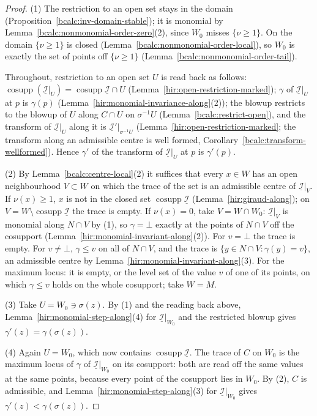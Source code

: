 \begin{proof}
\mixedleanok
(1) The restriction to an open set stays in the domain (Proposition~\ref{bcalc:inv-domain-stable}); it is monomial by Lemma~\ref{bcalc:nonmonomial-order-zero}(2), since
\(W_0\) misses \(\{\nu\ge1\}\). On the domain \(\{\nu\ge1\}\) is closed (Lemma~\ref{bcalc:nonmonomial-order-local}), so \(W_0\) is exactly the set of points off
\(\{\nu\ge1\}\) (Lemma~\ref{bcalc:nonmonomial-order-tail}).

Throughout, restriction to an open set \(U\) is read back as follows: \(\operatorname{cosupp}(\underline{\mathcal I}|_U)=\operatorname{cosupp}\underline{\mathcal I}\cap U\)
(Lemma~\ref{hir:open-restriction-marked}); \(\gamma\) of \(\underline{\mathcal I}|_U\) at \(p\) is \(\gamma(p)\) (Lemma~\ref{hir:monomial-invariance-along}(2)); the blowup restricts
to the blowup of \(U\) along \(C\cap U\) on \(\sigma^{-1}U\) (Lemma~\ref{bcalc:restrict-open}), and the transform of \(\underline{\mathcal I}|_U\) along it is
\(\underline{\mathcal I}'|_{\sigma^{-1}U}\) (Lemma~\ref{hir:open-restriction-marked}; the transform along an admissible centre is well formed,
Corollary~\ref{bcalc:transform-wellformed}). Hence \(\gamma'\) of the transform of \(\underline{\mathcal I}|_U\) at \(p\) is \(\gamma'(p)\).

(2) By Lemma~\ref{bcalc:centre-local}(2) it suffices that every \(x\in W\) has an open neighbourhood \(V\subset W\) on which the trace of the set is an admissible centre of
\(\underline{\mathcal I}|_V\). If \(\nu(x)\ge1\), \(x\) is not in the closed set \(\operatorname{cosupp}\underline{\mathcal I}\) (Lemma~\ref{hir:giraud-along}); on
\(V=W\setminus\operatorname{cosupp}\underline{\mathcal I}\) the trace is empty. If \(\nu(x)=0\), take \(V=W\cap W_0\): \(\underline{\mathcal I}|_V\) is monomial along \(N\cap V\)
by (1), so \(\gamma=\bot\) exactly at the points of \(N\cap V\) off the cosupport (Lemma~\ref{hir:monomial-invariant-along}(2)). For \(v=\bot\) the trace is empty. For
\(v\ne\bot\), \(\gamma\le v\) on all of \(N\cap V\), and the trace is \(\{y\in N\cap V:\gamma(y)=v\}\), an admissible centre by Lemma~\ref{hir:monomial-invariant-along}(3).
For the maximum locus: it is empty, or the level set of the value \(v\) of one of its points, on which \(\gamma\le v\) holds on the whole cosupport; take \(W=M\).

(3) Take \(U=W_0\ni\sigma(z)\). By (1) and the reading back above, Lemma~\ref{hir:monomial-step-along}(4) for \(\underline{\mathcal I}|_{W_0}\) and the restricted blowup gives
\(\gamma'(z)=\gamma(\sigma(z))\).

(4) Again \(U=W_0\), which now contains \(\operatorname{cosupp}\underline{\mathcal I}\). The trace of \(C\) on \(W_0\) is the maximum locus of \(\gamma\) of \(\underline{\mathcal I}|_{W_0}\) on
its cosupport: both are read off the same values at the same points, because every point of the cosupport lies in \(W_0\). By (2), \(C\) is admissible, and
Lemma~\ref{hir:monomial-step-along}(3) for \(\underline{\mathcal I}|_{W_0}\) gives \(\gamma'(z)<\gamma(\sigma(z))\).
\end{proof}

